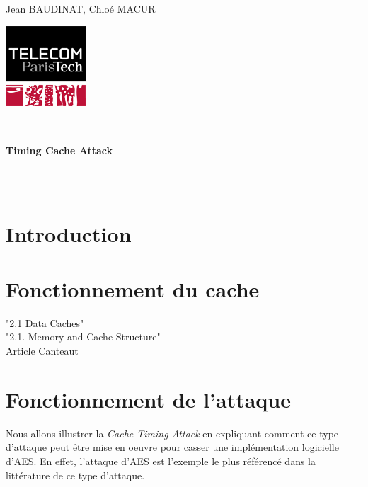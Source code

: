 \documentclass[a4paper,11pt]{article}
\newcommand{\HRule}{\rule{\linewidth}{0.5mm}}
\newcommand{\reporttitle}{Timing Cache Attack}
\newcommand{\reportauthor}{Jean BAUDINAT, Chloé MACUR}
\begin{document}
	

\begin{center}

\begin{minipage}[t]{0.4\textwidth}
  \begin{flushleft} \large
    \reportauthor
  \vfill
  \end{flushleft}
\end{minipage}
\begin{minipage}[t]{0.5\textwidth}
  \begin{flushright}
  \includegraphics [width=30mm]{figures/tpt.jpg} \\[0.5cm]
  \end{flushright}
\end{minipage}
\HRule \\[0.5cm]
{\huge \bfseries \reporttitle}\\[0.3cm]
\HRule \\[1.5cm]

\end{center}

\section*{Introduction} %

\section{Fonctionnement du cache}

"2.1 Data Caches"~\cite{brumley2009cache}\\
"2.1. Memory and Cache Structure"~\cite{tromer2010efficient}\\
Article Canteaut~\cite{canteaut2006understanding}

\section{Fonctionnement de l'attaque}

Nous allons illustrer la \emph{Cache Timing Attack} en expliquant comment ce type d'attaque peut être mise en oeuvre pour casser une implémentation logicielle d'AES. En effet, l'attaque d'AES est l'exemple le plus référencé dans la littérature de ce type d'attaque.
\end{document}

